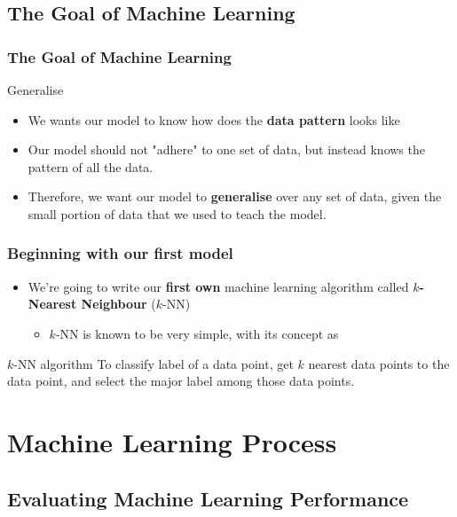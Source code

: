 \documentclass[aspectratio=169]{beamer}
\begin{document}
\subsection{The Goal of Machine Learning}

\begin{frame}
	\frametitle{The Goal of Machine Learning}
	\begin{center}
		\Huge Generalise
	\end{center}
	\begin{itemize}
		\item We wants our model to know how does the \textbf{data pattern} looks like
		\item Our model should not "adhere" to one set of data, but instead knows the pattern of all the data.
		\item Therefore, we want our model to \textbf{generalise} over any set of data, given the small portion of data that we used to teach the model.
	\end{itemize}
\end{frame}

\begin{frame}
	\frametitle{Beginning with our first model}
	\begin{itemize}
		\item<2-> We're going to write our \textbf{first own} machine learning algorithm called \textbf{$k$-Nearest Neighbour} ($k$-NN)
		      \begin{itemize}
			      \item<3-> $k$-NN is known to be very simple, with its concept as
		      \end{itemize}
	\end{itemize}
	\begin{block}{$k$-NN algorithm}
		To classify label of a data point, get $k$ nearest data points to the data point, and select the major label among those data points.
	\end{block}
\end{frame}

\section{Machine Learning Process}

\subsection{Evaluating Machine Learning Performance}
\end{document}
